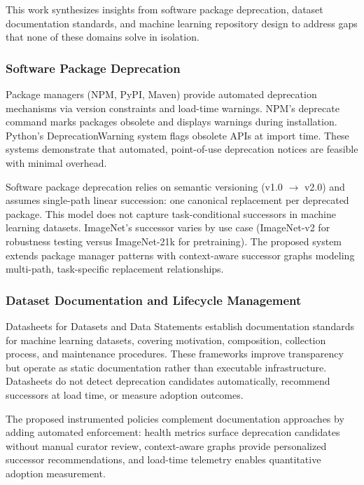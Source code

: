
This work synthesizes insights from software package deprecation, dataset documentation standards, and machine learning repository design to address gaps that none of these domains solve in isolation.

\subsubsection{Software Package Deprecation}

Package managers (NPM, PyPI, Maven) provide automated deprecation mechanisms via version constraints and load-time warnings. NPM's deprecate command marks packages obsolete and displays warnings during installation. Python's DeprecationWarning system flags obsolete APIs at import time. These systems demonstrate that automated, point-of-use deprecation notices are feasible with minimal overhead.

Software package deprecation relies on semantic versioning (v1.0 $\rightarrow$ v2.0) and assumes single-path linear succession: one canonical replacement per deprecated package. This model does not capture task-conditional successors in machine learning datasets. ImageNet's successor varies by use case (ImageNet-v2 for robustness testing versus ImageNet-21k for pretraining). The proposed system extends package manager patterns with context-aware successor graphs modeling multi-path, task-specific replacement relationships.

\subsubsection{Dataset Documentation and Lifecycle Management}

Datasheets for Datasets \citep{Gebru2018} and Data Statements \citep{bender2018data} establish documentation standards for machine learning datasets, covering motivation, composition, collection process, and maintenance procedures. These frameworks improve transparency but operate as static documentation rather than executable infrastructure. Datasheets do not detect deprecation candidates automatically, recommend successors at load time, or measure adoption outcomes.

The proposed instrumented policies complement documentation approaches by adding automated enforcement: health metrics surface deprecation candidates without manual curator review, context-aware graphs provide personalized successor recommendations, and load-time telemetry enables quantitative adoption measurement.

